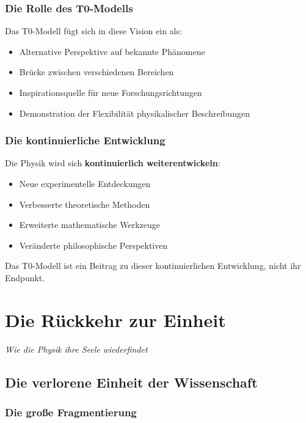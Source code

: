 \documentclass[12pt,a4paper]{report}
\begin{document}
	\subsection{Die Rolle des T0-Modells}
	
	Das T0-Modell fügt sich in diese Vision ein als:
	
	\begin{itemize}
		\item Alternative Perspektive auf bekannte Phänomene
		\item Brücke zwischen verschiedenen Bereichen
		\item Inspirationsquelle für neue Forschungsrichtungen
		\item Demonstration der Flexibilität physikalischer Beschreibungen
	\end{itemize}
	
	\subsection{Die kontinuierliche Entwicklung}
	
	Die Physik wird sich \textbf{kontinuierlich weiterentwickeln}:
	
	\begin{itemize}
		\item Neue experimentelle Entdeckungen
		\item Verbesserte theoretische Methoden
		\item Erweiterte mathematische Werkzeuge
		\item Veränderte philosophische Perspektiven
	\end{itemize}
	
	Das T0-Modell ist ein Beitrag zu dieser kontinuierlichen Entwicklung, nicht ihr Endpunkt.
	\chapter{Die Rückkehr zur Einheit}
	\textit{Wie die Physik ihre Seele wiederfindet}
	
	\section{Die verlorene Einheit der Wissenschaft}
	
	\subsection{Die große Fragmentierung}
	
\end{document}

